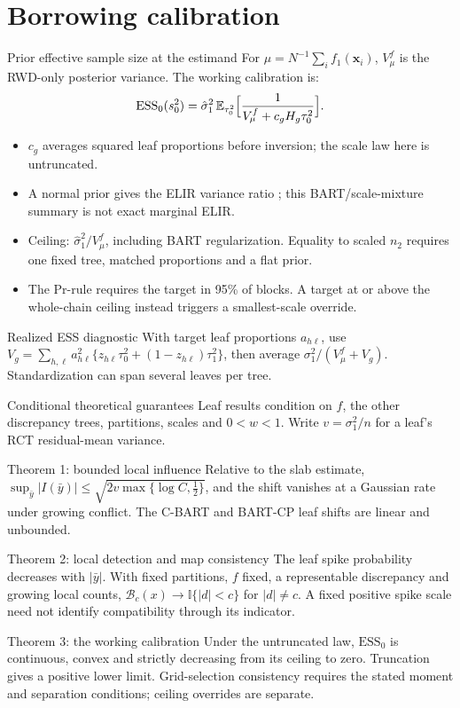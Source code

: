 \documentclass[11pt,aspectratio=169]{beamer}
\newcommand{\E}{\mathbb{E}}
\newcommand{\bx}{\bm{x}}
\begin{document}
\section{Borrowing calibration}
\begin{frame}{Prior effective sample size at the estimand}
  \footnotesize
  For $\mu=N^{-1}\sum_i f_1(\bx_i)$, $V_\mu^f$ is the RWD-only posterior variance. The working calibration is:
  \[
    \mathrm{ESS}_0(s_0^2)=\hat\sigma_1^2\,\E_{\tau_0^2}\Bigl[\frac{1}{V_\mu^f+c_gH_g\tau_0^2}\Bigr].
  \]
  \begin{itemize}
    \item $c_g$ averages squared leaf proportions before inversion; the scale law here is untruncated.
    \item A normal prior gives the ELIR variance ratio \citep{neuenschwander2020}; this BART/scale-mixture summary is not exact marginal ELIR.
    \item Ceiling: $\hat\sigma_1^2/V_\mu^f$, including BART regularization. Equality to scaled $n_2$ requires one fixed tree, matched proportions and a flat prior.
    \item The Pr-rule requires the target in 95\% of blocks. A target at or above the whole-chain ceiling instead triggers a smallest-scale override.
  \end{itemize}
  \begin{block}{Realized ESS diagnostic}
    With target leaf proportions $a_{h\ell}$, use $V_g=\sum_{h,\ell}a_{h\ell}^2\{z_{h\ell}\tau_0^2+(1-z_{h\ell})\tau_1^2\}$, then average $\sigma_1^2/(V_\mu^f+V_g)$. Standardization can span several leaves per tree.
  \end{block}
\end{frame}

\begin{frame}{Conditional theoretical guarantees}
  \footnotesize
  Leaf results condition on $f$, the other discrepancy trees, partitions, scales and $0<w<1$. Write $v=\sigma_1^2/n$ for a leaf's RCT residual-mean variance.
  \begin{block}{Theorem 1: bounded local influence}
    Relative to the slab estimate, $\sup_{\bar y}|I(\bar y)|\le\sqrt{2v\max\{\log C,\tfrac12\}}$, and the shift vanishes at a Gaussian rate under growing conflict. The C-BART and BART-CP leaf shifts are linear and unbounded.
  \end{block}
  \begin{block}{Theorem 2: local detection and map consistency}
    The leaf spike probability decreases with $|\bar y|$. With fixed partitions, $f$ fixed, a representable discrepancy and growing local counts, $\mathcal B_c(x)\to\mathbb I\{|d|<c\}$ for $|d|\ne c$. A fixed positive spike scale need not identify compatibility through its indicator.
  \end{block}
  \begin{block}{Theorem 3: the working calibration}
    Under the untruncated law, $\mathrm{ESS}_0$ is continuous, convex and strictly decreasing from its ceiling to zero. Truncation gives a positive lower limit. Grid-selection consistency requires the stated moment and separation conditions; ceiling overrides are separate.
  \end{block}
\end{frame}
\end{document}
